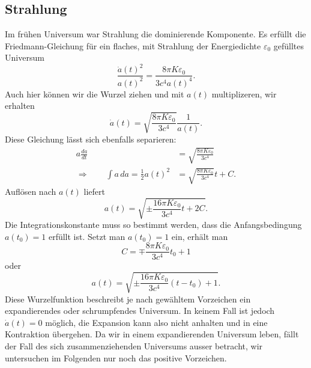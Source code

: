 \subsection{Strahlung}
Im frühen Universum war Strahlung die dominierende Komponente.
Es erfüllt die Friedmann-Gleichung für ein flaches, mit Strahlung
der Energiedichte $\varepsilon_0$ gefülltes Universum
\begin{equation*}
\frac{\dot a(t)^2}{a(t)^2}
=
\frac{8\pi K\varepsilon_0}{3c^4 a(t)^4}.
\end{equation*}
Auch hier können wir die Wurzel ziehen und mit $a(t)$ multiplizeren,
wir erhalten
\begin{equation*}
\dot a(t)
=
\sqrt{\frac{8\pi K\varepsilon_0}{3c^4}}\frac1{a(t)}.
\end{equation*}
Diese Gleichung lässt sich ebenfalls separieren:
\begin{align*}
a\frac{da}{dt}
&=
\sqrt{\frac{8\pi K\varepsilon_0}{3c^4}}
\\
\Rightarrow\qquad
\int a\,da
=
\frac12a(t)^2
&=
\sqrt{\frac{8\pi K\varepsilon_0}{3c^4}}t + C.
\end{align*}
Auflösen nach $a(t)$ liefert
\[
a(t)
=
\sqrt{\pm\frac{16\pi K\varepsilon_0}{3c^4}t + 2C}.
\]
Die Integrationskonstante muss so bestimmt werden, dass die
Anfangsbedingung $a(t_0)=1$  erfüllt ist.
Setzt man $a(t_0)=1$ ein, erhält man
\[
C
=
\mp\frac{8\pi K\varepsilon_0}{3c^4}t_0+1
\]
oder
\begin{equation}
a(t)
= 
\sqrt{\pm\frac{16\pi K\varepsilon_0}{3c^4}(t-t_0) + 1}.
\label{skript:friedmann:a(t)}
\end{equation}
Diese Wurzelfunktion beschreibt je nach gewähltem Vorzeichen ein
expandierendes oder schrumpfendes Universum.
In keinem Fall ist jedoch $\dot a(t)=0$ möglich, die Expansion kann
also nicht anhalten und in eine Kontraktion übergehen.
Da wir in einem expandierenden Universum leben, fällt der Fall
des sich zusammenziehenden Universums ausser betracht,
wir untersuchen im Folgenden nur noch das positive Vorzeichen.

